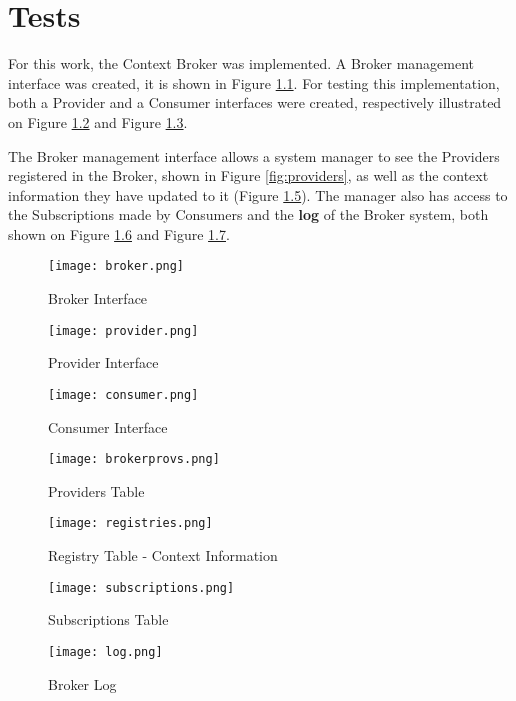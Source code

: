 \chapter{Tests}
\label{chap:tests}
For this work, the Context Broker was implemented. A Broker management interface was created, it is shown in Figure \ref{fig:broker}. For testing this implementation, both a Provider and a Consumer interfaces were created, respectively illustrated on Figure \ref{fig:provider} and Figure \ref{fig:consumer}.

The Broker management interface allows a system manager to see the Providers registered in the Broker, shown in Figure \ref{fig:providers}, as well as the context information they have updated to it (Figure \ref{fig:registries}). The manager also has access to the Subscriptions made by Consumers and the \textbf{log} of the Broker system, both shown on Figure \ref{fig:subscriptions} and Figure \ref{fig:log}. \par

\begin{figure}[H]
	\centering
	\texttt{[image: broker.png]}
	\caption{Broker Interface}
	\label{fig:broker}
	
\end{figure}

\begin{figure}[H]
	\centering
	\texttt{[image: provider.png]}
	\caption{Provider Interface}
	\label{fig:provider}
	
\end{figure}

\begin{figure}[H]
	\centering
	\texttt{[image: consumer.png]}
	\caption{Consumer Interface}
	\label{fig:consumer}
	
\end{figure}

\begin{figure}[H]
	\centering
	\texttt{[image: brokerprovs.png]}
	\caption{Providers Table}
	\label{fig:brokerprovs}
	
\end{figure}

\begin{figure}[H]
	\centering
	\texttt{[image: registries.png]}
	\caption{Registry Table - Context Information}
	\label{fig:registries}
	
\end{figure}

\begin{figure}[H]
	\centering
	\texttt{[image: subscriptions.png]}
	\caption{Subscriptions Table}
	\label{fig:subscriptions}
	
\end{figure}

\begin{figure}[H]
	\centering
	\texttt{[image: log.png]}
	\caption{Broker Log}
	\label{fig:log}
	
\end{figure}

 
